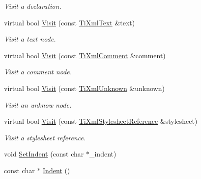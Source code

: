 \begin{DoxyCompactItemize}
\begin{DoxyCompactList}\small\item\em Visit a declaration. \item\end{DoxyCompactList}\item 
\hypertarget{class_ti_xml_printer_a0857c5d32c59b9a257f9a49cb9411df5}{
virtual bool \hyperlink{class_ti_xml_printer_a0857c5d32c59b9a257f9a49cb9411df5}{Visit} (const \hyperlink{class_ti_xml_text}{TiXmlText} \&text)}
\label{class_ti_xml_printer_a0857c5d32c59b9a257f9a49cb9411df5}

\begin{DoxyCompactList}\small\item\em Visit a text node. \item\end{DoxyCompactList}\item 
\hypertarget{class_ti_xml_printer_a9870423f5603630e6142f6bdb66dfb57}{
virtual bool \hyperlink{class_ti_xml_printer_a9870423f5603630e6142f6bdb66dfb57}{Visit} (const \hyperlink{class_ti_xml_comment}{TiXmlComment} \&comment)}
\label{class_ti_xml_printer_a9870423f5603630e6142f6bdb66dfb57}

\begin{DoxyCompactList}\small\item\em Visit a comment node. \item\end{DoxyCompactList}\item 
\hypertarget{class_ti_xml_printer_a08591a15c9a07afa83c24e08b03d6358}{
virtual bool \hyperlink{class_ti_xml_printer_a08591a15c9a07afa83c24e08b03d6358}{Visit} (const \hyperlink{class_ti_xml_unknown}{TiXmlUnknown} \&unknown)}
\label{class_ti_xml_printer_a08591a15c9a07afa83c24e08b03d6358}

\begin{DoxyCompactList}\small\item\em Visit an unknow node. \item\end{DoxyCompactList}\item 
\hypertarget{class_ti_xml_printer_a38fd7855a077f5075bd34557cbdb6722}{
virtual bool \hyperlink{class_ti_xml_printer_a38fd7855a077f5075bd34557cbdb6722}{Visit} (const \hyperlink{class_ti_xml_stylesheet_reference}{TiXmlStylesheetReference} \&stylesheet)}
\label{class_ti_xml_printer_a38fd7855a077f5075bd34557cbdb6722}

\begin{DoxyCompactList}\small\item\em Visit a stylesheet reference. \item\end{DoxyCompactList}\item 
void \hyperlink{class_ti_xml_printer_a213377a4070c7e625bae59716b089e5e}{SetIndent} (const char $\ast$\_\-indent)
\item 
\hypertarget{class_ti_xml_printer_abb33ec7d4bad6aaeb57f4304394b133d}{
const char $\ast$ \hyperlink{class_ti_xml_printer_abb33ec7d4bad6aaeb57f4304394b133d}{Indent} ()}
\label{class_ti_xml_printer_abb33ec7d4bad6aaeb57f4304394b133d}


\end{DoxyCompactItemize}
